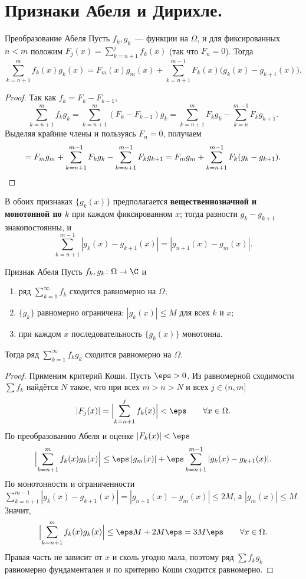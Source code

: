 
\section{Признаки Абеля и Дирихле.}

\begin{Lemma}{Преобразование Абеля}{}
	Пусть $f_k, g_k$~--- функции на $\Omega$, и для фиксированных $n < m$ положим $F_j(x) = \sum_{k=n+1}^{j} f_k(x)$ (так что $F_n = 0$). Тогда
	\[
	\sum_{k=n+1}^{m} f_k(x) g_k(x) = F_m(x) g_m(x) + \sum_{k=n+1}^{m-1} F_k(x)\bigl(g_k(x) - g_{k+1}(x)\bigr).
	\]
\end{Lemma}

\begin{proof}
	Так как $f_k = F_k - F_{k-1}$,
	\[
	\sum_{k=n+1}^{m} f_k g_k = \sum_{k=n+1}^{m} (F_k - F_{k-1}) g_k = \sum_{k=n+1}^{m} F_k g_k - \sum_{k=n}^{m-1} F_k g_{k+1}.
	\]
	Выделяя крайние члены и пользуясь $F_n = 0$, получаем
	\[
	= F_m g_m + \sum_{k=n+1}^{m-1} F_k g_k - \sum_{k=n+1}^{m-1} F_k g_{k+1}
	= F_m g_m + \sum_{k=n+1}^{m-1} F_k (g_k - g_{k+1}). \qedhere
	\]
\end{proof}

В обоих признаках $\{g_k(x)\}$ предполагается \textbf{вещественнозначной и монотонной по $k$} при каждом фиксированном $x$; тогда разности $g_k - g_{k+1}$ знакопостоянны, и
\[
\sum_{k=n+1}^{m-1} |g_k(x) - g_{k+1}(x)| = |g_{n+1}(x) - g_m(x)|. 
\]

\begin{Theorem}{Признак Абеля}{}
	Пусть $f_k, g_k \colon \Omega \to \C$ и
	\begin{enumerate}
		\item ряд $\sum_{k=1}^{\infty} f_k$ сходится равномерно на $\Omega$;
		\item $\{g_k\}$ равномерно ограничена: $|g_k(x)| \le M$ для всех $k$ и $x$;
		\item при каждом $x$ последовательность $\{g_k(x)\}$ монотонна.
	\end{enumerate}
	Тогда ряд $\sum_{k=1}^{\infty} f_k g_k$ сходится равномерно на $\Omega$.
\end{Theorem}

\begin{proof}
	Применим критерий Коши. Пусть $\eps > 0$. Из равномерной сходимости $\sum f_k$ найдётся $N$ такое, что при всех $m > n > N$ и всех $j \in (n, m]$
	\[
	|F_j(x)| = \Bigl| \sum_{k=n+1}^{j} f_k(x) \Bigr| < \eps \qquad \forall x \in \Omega.
	\]
	По преобразованию Абеля и оценке $|F_k(x)| < \eps$
	\[
	\Bigl| \sum_{k=n+1}^{m} f_k(x) g_k(x) \Bigr| \le \eps\,|g_m(x)| + \eps \sum_{k=n+1}^{m-1} |g_k(x) - g_{k+1}(x)|.
	\]
	По монотонности и ограниченности $\sum_{k=n+1}^{m-1}|g_k(x) - g_{k+1}(x)| = |g_{n+1}(x) - g_m(x)| \le 2M$, а $|g_m(x)| \le M$. Значит,
	\[
	\Bigl| \sum_{k=n+1}^{m} f_k(x) g_k(x) \Bigr| \le \eps M + 2M\eps = 3M\eps \qquad \forall x \in \Omega.
	\]
	Правая часть не зависит от $x$ и сколь угодно мала, поэтому ряд $\sum f_k g_k$ равномерно фундаментален и по критерию Коши сходится равномерно.
\end{proof}

